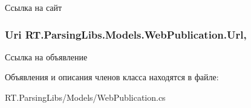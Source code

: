 Ссылка на сайт 

\hypertarget{class_r_t_1_1_parsing_libs_1_1_models_1_1_web_publication_a0454089a5089f84a07ab7319af913ad1}{
\subsubsection[{Url}]{\setlength{\rightskip}{0pt plus 5cm}Uri R\+T.\+Parsing\+Libs.\+Models.\+Web\+Publication.\+Url\hspace{0.3cm}{\ttfamily [get]}, {\ttfamily [set]}}}\label{class_r_t_1_1_parsing_libs_1_1_models_1_1_web_publication_a0454089a5089f84a07ab7319af913ad1}


Ссылка на объявление 



Объявления и описания членов класса находятся в файле\+:\begin{DoxyCompactItemize}
\item 
R\+T.\+Parsing\+Libs/\+Models/Web\+Publication.\+cs\end{DoxyCompactItemize}
